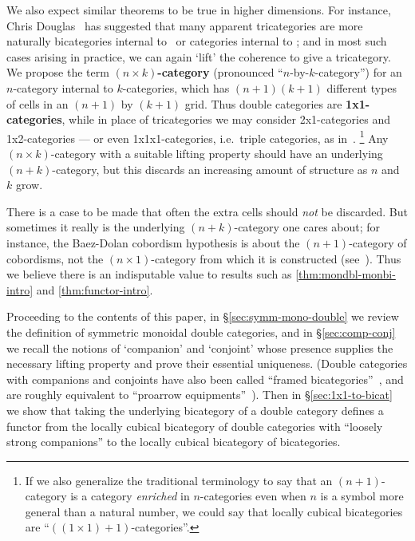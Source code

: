 \begin{rmk}
We also expect similar theorems to be true in higher dimensions.  For
instance, Chris Douglas~\cite{douglas:tfttalk} has suggested that many
apparent tricategories are more naturally bicategories internal to
\cCat\ or categories internal to \cTwocat; and in most such cases
arising in practice, we can again `lift' the coherence to give a
tricategory.
%
We propose the term \textbf{$(n\times k)$-category}
(pronounced ``$n$-by-$k$-category'') for an $n$-category internal to
$k$-categories, which has $(n+1)(k+1)$ different types of
cells in an $(n+1)$ by $(k+1)$ grid.  Thus
double categories are \textbf{1x1-categories}, while in
place of tricategories we may consider 2x1-categories and
1x2-categories --- or even 1x1x1-categories, i.e.\ triple categories,
as in~\cite{gp:intercategories-i,gp:intercategories-ii}.%
\footnote{If we also generalize the traditional terminology to say that an $(n+1)$-category is a category \emph{enriched} in $n$-categories even when $n$ is a symbol more general than a natural number, we could say that locally cubical bicategories are ``$((1\times 1)+1)$-categories''.}
Any
$(n\times k)$-category with a suitable lifting property
should have an underlying $(n+k)$-category, but this discards an increasing amount of structure as $n$ and $k$ grow.


There is a case to be made that often the extra cells should
\emph{not} be discarded.  But sometimes
it really is the underlying $(n+k)$-category one cares about; for
instance, the Baez-Dolan cobordism hypothesis is about the $(n+1)$-category of cobordisms, not
the $(n\times 1)$-category from which it is constructed
(see~\cite{lurie:tft}).  Thus we believe there is an indisputable value to
results such as \autoref{thm:mondbl-monbi-intro} and \autoref{thm:functor-intro}.
\end{rmk}

Proceeding to the contents of this paper, in
\S\ref{sec:symm-mono-double} we review the definition of symmetric
monoidal double categories, and in \S\ref{sec:comp-conj} we recall the
notions of `companion' and `conjoint' whose presence supplies the
necessary lifting property and prove their essential uniqueness.
(Double categories with companions and conjoints have also been called ``framed bicategories''~\cite{shulman:frbi}, and are roughly equivalent to ``proarrow equipments''~\cite{wood:proarrows-i}).
Then in \S\ref{sec:1x1-to-bicat} we show that taking the underlying bicategory of a double category defines a functor from the locally cubical bicategory of double categories with ``loosely strong companions'' to the locally cubical bicategory of bicategories.



